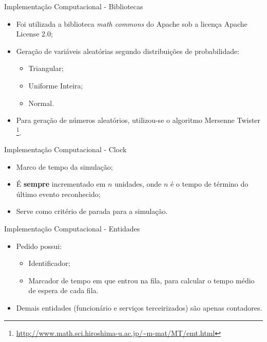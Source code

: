 \documentclass[xcolor=dvipsnames]{beamer}
\let\olditem=\item%
\renewcommand{\item}{\olditem \justifying}%
\begin{document}
\begin{frame}{Implementação Computacional - Bibliotecas}
	\begin{itemize}
		\item Foi utilizada a biblioteca \textit{math commons} do Apache sob a licença Apache License 2.0;
		      			
		      \bigskip
		      			
		\item Geração de variáveis aleatórias segundo distribuições de probabilidade:
		      \begin{itemize}
		      	\item Triangular;
		      	      \bigskip
		      	\item Uniforme Inteira;
		      	      \bigskip
		      	\item Normal.
		      \end{itemize}
		      			
		      \bigskip
		      			
		\item Para geração de números aleatórios, utilizou-se o algoritmo Mersenne Twister \footnote{\url{http://www.math.sci.hiroshima-u.ac.jp/~m-mat/MT/emt.html}}.
	\end{itemize}
\end{frame}
	
\begin{frame}{Implementação Computacional - Clock}
	\begin{itemize}
		\item Marco de tempo da simulação;
		\bigskip
		\item É \textbf{sempre} incrementado em $n$ unidades, onde $n$ é o tempo de término do último evento reconhecido;
        \bigskip
		\item Serve como critério de parada para a simulação.
	\end{itemize}
\end{frame}
	
\begin{frame}{Implementação Computacional - Entidades}
	\begin{itemize}
		\item Pedido possui:
        \bigskip
		      \begin{itemize}
		      	\item Identificador;
		      	      \bigskip
		      	\item Marcador de tempo em que entrou na fila, para calcular o tempo médio de espera de cada fila.
		      \end{itemize}
		      \bigskip
		\item Demais entidades (funcionário e serviços terceirizados) são apenas contadores.
	\end{itemize}
\end{frame}
	
\end{document}
